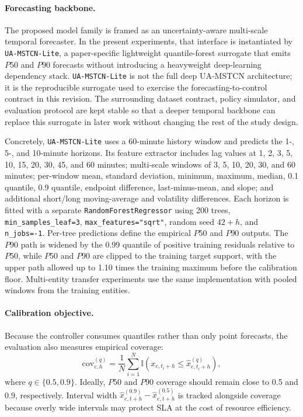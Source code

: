 \paragraph{Forecasting backbone.}
The proposed model family is framed as an uncertainty-aware multi-scale temporal forecaster. In the present experiments, that interface is instantiated by \texttt{UA-MSTCN-Lite}, a paper-specific lightweight quantile-forest surrogate that emits $P50$ and $P90$ forecasts without introducing a heavyweight deep-learning dependency stack. \texttt{UA-MSTCN-Lite} is not the full deep UA-MSTCN architecture; it is the reproducible surrogate used to exercise the forecasting-to-control contract in this revision. The surrounding dataset contract, policy simulator, and evaluation protocol are kept stable so that a deeper temporal backbone can replace this surrogate in later work without changing the rest of the study design.

Concretely, \texttt{UA-MSTCN-Lite} uses a 60-minute history window and predicts the 1-, 5-, and 10-minute horizons. Its feature extractor includes lag values at 1, 2, 3, 5, 10, 15, 20, 30, 45, and 60 minutes; multi-scale windows of 3, 5, 10, 20, 30, and 60 minutes; per-window mean, standard deviation, minimum, maximum, median, 0.1 quantile, 0.9 quantile, endpoint difference, last-minus-mean, and slope; and additional short/long moving-average and volatility differences. Each horizon is fitted with a separate \texttt{RandomForestRegressor} using 200 trees, \texttt{min\_samples\_leaf=3}, \texttt{max\_features="sqrt"}, random seed $42+h$, and \texttt{n\_jobs=-1}. Per-tree predictions define the empirical $P50$ and $P90$ outputs. The $P90$ path is widened by the 0.99 quantile of positive training residuals relative to $P50$, while $P50$ and $P90$ are clipped to the training target support, with the upper path allowed up to 1.10 times the training maximum before the calibration floor. Multi-entity transfer experiments use the same implementation with pooled windows from the training entities.

\paragraph{Calibration objective.}
Because the controller consumes quantiles rather than only point forecasts, the evaluation also measures empirical coverage:
\[
\mathrm{cov}^{(q)}_{e,h} = \frac{1}{N}\sum_{i=1}^{N}\mathbb{I}\left(x_{e,t_i+h} \le \hat{x}^{(q)}_{e,t_i+h}\right),
\]
where $q \in \{0.5, 0.9\}$. Ideally, $P50$ and $P90$ coverage should remain close to 0.5 and 0.9, respectively. Interval width $\hat{x}^{(0.9)}_{e,t+h} - \hat{x}^{(0.5)}_{e,t+h}$ is tracked alongside coverage because overly wide intervals may protect SLA at the cost of resource efficiency.

